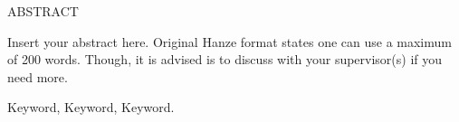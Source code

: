 \begin{center}
    ABSTRACT
\vspace{5mm} %
\end{center}

Insert your abstract here. Original Hanze format states one can use a maximum of 200 words. Though, it is advised is to discuss with your supervisor(s) if you need more.

\vspace{5mm} %
 Keyword, Keyword, Keyword.  %
